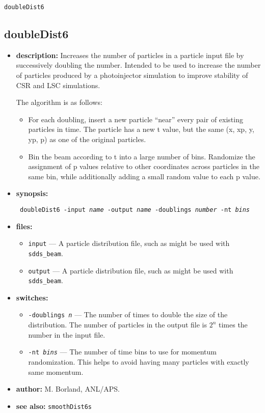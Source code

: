 \documentclass[11pt]{article}
\begin{document}
\newpage
\begin{center}{\Large\verb|doubleDist6|}\end{center}
\subsection{doubleDist6}

\begin{itemize}
\item {\bf description:} Increases the number of particles in a particle input file by
 successively doubling the number.  Intended to be used to increase the number of particles
 produced by a photoinjector simulation to improve stability of CSR and LSC simulations.

The algorithm is as follows:
\begin{itemize}
\item For each doubling, insert a new particle ``near'' every pair of existing particles in time.
    The particle has a new t value, but the same (x, xp, y, yp, p) as one of the original particles.
\item Bin the beam according to t into a large number of bins.  Randomize the assignment of p values
    relative to other coordinates across particles in the same bin, while additionally adding a 
    small random value to each p value.
\end{itemize}

\item {\bf synopsis:}
\begin{flushleft}{\tt
doubleDist6 -input {\em name} -output {\em name} -doublings {\em number} -nt {\em bins}
}\end{flushleft}

\item {\bf files:}
\begin{itemize}
\item {\tt input} --- A particle distribution file, such as might be used with \verb|sdds_beam|.
\item {\tt output} --- A particle distribution file, such as might be used with \verb|sdds_beam|.
\end{itemize}

\item {\bf switches:}
\begin{itemize}
\item {\tt -doublings {\em n}} --- The number of times to double the size of the distribution.
 The number of particles in the output file is $2^n$ times the number in the input file.
\item {\tt -nt {\em bins}} --- The number of time bins to use for momentum randomization. This
 helps to avoid having many particles with exactly same momentum.
\end{itemize}

\item {\bf author:} M. Borland, ANL/APS.

\item {\bf see also:} {\tt smoothDist6s}
\end{itemize}
\end{document}
